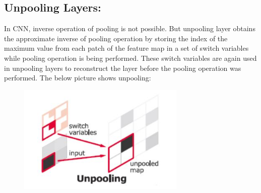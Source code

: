 \documentclass{IEEEtran}
\begin{document}
\subsection{\textbf{Unpooling Layers:}}
In CNN, inverse operation of pooling is not possible. But unpooling layer obtains the approximate inverse of pooling operation by storing the index of the maximum value from each patch of the feature map in a set of switch variables while pooling operation is being performed. These switch variables  are again used in unpooling layers to reconstruct the layer before the pooling operation was performed. The below picture shows unpooling:

\begin{figure}[h]
    \centering
    \captionsetup{justification=centering}
    \includegraphics[width=8cm]{unpool}
    \caption{}
    \label{fig:}
\end{figure}
  
\end{document}
